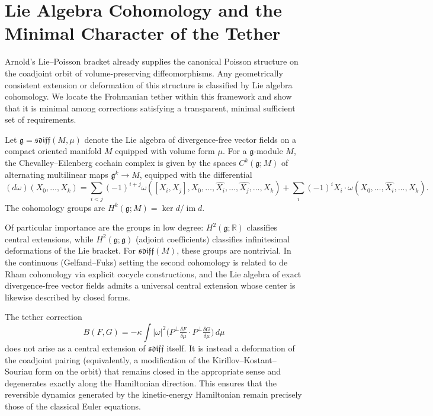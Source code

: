 \documentclass[11pt,a4paper]{article}
\begin{document}
\section{Lie Algebra Cohomology and the Minimal Character of the Tether}

Arnold’s Lie–Poisson bracket already supplies the canonical Poisson structure on the coadjoint orbit of volume-preserving diffeomorphisms. Any geometrically consistent extension or deformation of this structure is classified by Lie algebra cohomology. We locate the Frohmanian tether within this framework and show that it is minimal among corrections satisfying a transparent, minimal sufficient set of requirements.

Let \(\mathfrak{g} = \mathfrak{sdiff}(M,\mu)\) denote the Lie algebra of divergence-free vector fields on a compact oriented manifold \(M\) equipped with volume form \(\mu\). For a \(\mathfrak{g}\)-module \(M\), the Chevalley–Eilenberg cochain complex is given by the spaces \(C^k(\mathfrak{g};M)\) of alternating multilinear maps \(\mathfrak{g}^k \to M\), equipped with the differential
\[
(d\omega)(X_0,\dots,X_k)=\sum_{i<j}(-1)^{i+j}\omega([X_i,X_j],X_0,\dots,\widehat{X_i},\dots,\widehat{X_j},\dots,X_k)
+\sum_i(-1)^i X_i\cdot\omega(X_0,\dots,\widehat{X_i},\dots,X_k).
\]
The cohomology groups are \(H^k(\mathfrak{g};M)=\ker d/\operatorname{im} d\).

Of particular importance are the groups in low degree: \(H^2(\mathfrak{g};\mathbb{R})\) classifies central extensions, while \(H^2(\mathfrak{g};\mathfrak{g})\) (adjoint coefficients) classifies infinitesimal deformations of the Lie bracket. For \(\mathfrak{sdiff}(M)\), these groups are nontrivial. In the continuous (Gelfand–Fuks) setting the second cohomology is related to de Rham cohomology via explicit cocycle constructions, and the Lie algebra of exact divergence-free vector fields admits a universal central extension whose center is likewise described by closed forms.

The tether correction
\[
B(F,G)=-\kappa\int|\omega|^2\bigl(P^\perp\tfrac{\delta F}{\delta\mu}\cdot P^\perp\tfrac{\delta G}{\delta\mu}\bigr)\,d\mu
\]
does not arise as a central extension of \(\mathfrak{sdiff}\) itself. It is instead a deformation of the coadjoint pairing (equivalently, a modification of the Kirillov–Kostant–Souriau form on the orbit) that remains closed in the appropriate sense and degenerates exactly along the Hamiltonian direction. This ensures that the reversible dynamics generated by the kinetic-energy Hamiltonian remain precisely those of the classical Euler equations.
\end{document}
